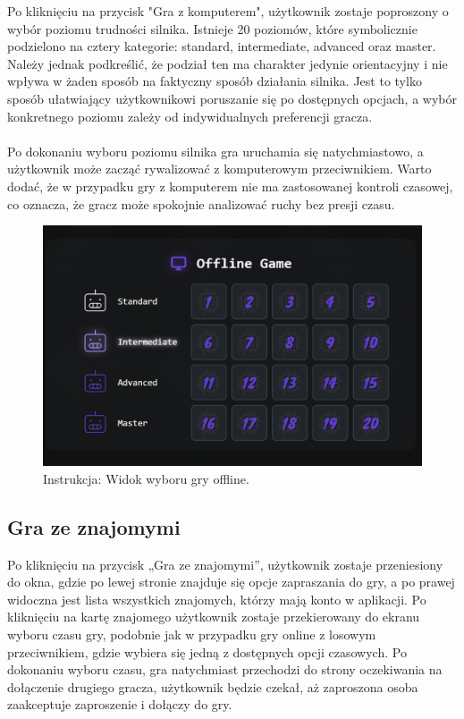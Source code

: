 \documentclass[twoside]{projektInzynierskiMS1}
\begin{document}
\noindent
Po kliknięciu na przycisk "Gra z komputerem", użytkownik zostaje poproszony o wybór poziomu trudności silnika. Istnieje 20 poziomów, które symbolicznie podzielono na cztery kategorie: standard, intermediate, advanced oraz master. Należy jednak podkreślić, że podział ten ma charakter jedynie orientacyjny i nie wpływa w żaden sposób na faktyczny sposób działania silnika. Jest to tylko sposób ułatwiający użytkownikowi poruszanie się po dostępnych opcjach, a wybór konkretnego poziomu zależy od indywidualnych preferencji gracza.
\\\\
Po dokonaniu wyboru poziomu silnika gra uruchamia się natychmiastowo, a użytkownik może zacząć rywalizować z komputerowym przeciwnikiem. Warto dodać, że w przypadku gry z komputerem nie ma zastosowanej kontroli czasowej, co oznacza, że gracz może spokojnie analizować ruchy bez presji czasu.

\vspace{0.5cm}
\begin{figure}[h!]
    \centering
    \includegraphics[width=1\textwidth]{images/ins_min_pvc.png}
    \caption{Instrukcja: Widok wyboru gry offline.}
\end{figure}

\newpage

\subsection{Gra ze znajomymi}

\noindent
Po kliknięciu na przycisk „Gra ze znajomymi”, użytkownik zostaje przeniesiony do okna, gdzie po lewej stronie znajduje się opcje zapraszania do gry, a po prawej widoczna jest lista wszystkich znajomych, którzy mają konto w aplikacji. Po kliknięciu na kartę znajomego użytkownik zostaje przekierowany do ekranu wyboru czasu gry, podobnie jak w przypadku gry online z losowym przeciwnikiem, gdzie wybiera się jedną z dostępnych opcji czasowych. Po dokonaniu wyboru czasu, gra natychmiast przechodzi do strony oczekiwania na dołączenie drugiego gracza, użytkownik będzie czekał, aż zaproszona osoba zaakceptuje zaproszenie i dołączy do gry.
\end{document}
